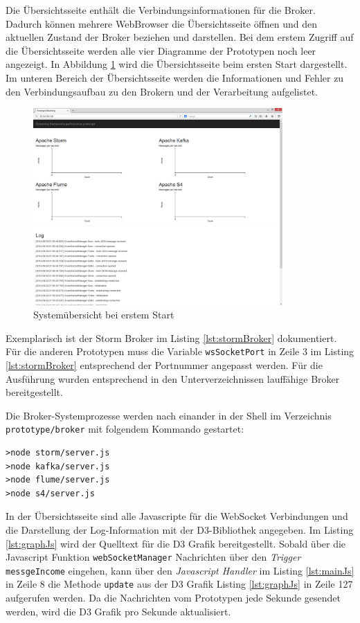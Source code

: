 Die Übersichtsseite enthält die Verbindungsinformationen für die Broker. Dadurch können mehrere WebBrowser die Übersichtsseite öffnen und den aktuellen Zustand der Broker beziehen und darstellen. Bei dem erstem Zugriff auf die Übersichtsseite werden alle vier Diagramme der Prototypen noch leer angezeigt. In Abbildung \ref{fig:systemOverviewStart} wird die Übersichtsseite beim ersten Start dargestellt. Im unteren Bereich der Übersichtsseite werden die Informationen und Fehler zu den Verbindungsaufbau zu den Brokern und der Verarbeitung aufgelistet. 

\begin{figure}[htb!]
\centering
\includegraphics[width=0.85\textwidth]{bilder/PrototypeStreaming001.png}
\caption{Systemübersicht bei erstem Start
\label{fig:systemOverviewStart}}
\end{figure}

Exemplarisch ist der Storm Broker im Listing \ref{lst:stormBroker} dokumentiert. Für die anderen Prototypen muss die Variable \texttt{wsSocketPort} in Zeile 3 im Listing \ref{lst:stormBroker} entsprechend der Portnummer angepasst werden. Für die Ausführung wurden entsprechend in den Unterverzeichnissen lauffähige Broker bereitgestellt.

Die Broker-Systemprozesse werden nach einander in der Shell im Verzeichnis \texttt{prototype/broker} mit folgendem Kommando gestartet:
\begin{verbatim}
>node storm/server.js
>node kafka/server.js
>node flume/server.js
>node s4/server.js
\end{verbatim}

In der Übersichtsseite sind alle Javascripte für die WebSocket Verbindungen und die Darstellung der Log-Information mit der D3-Bibliothek angegeben. Im Listing \ref{lst:graphJs} wird der Quelltext für die D3 Grafik bereitgestellt. Sobald über die Javascript Funktion \texttt{webSocketManager} Nachrichten über den \textit{Trigger} \texttt{messgeIncome} eingehen, kann über den \textit{Javascript Handler} im Listing \ref{lst:mainJs} in Zeile 8 die Methode \texttt{update} aus der D3 Grafik Listing \ref{lst:graphJs} in Zeile 127 aufgerufen werden. Da die Nachrichten vom Prototypen jede Sekunde gesendet werden, wird die D3 Grafik pro Sekunde aktualisiert.

